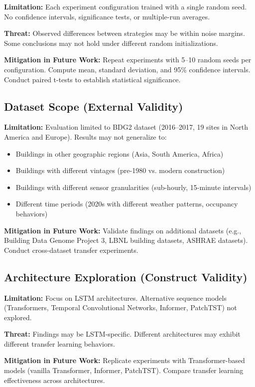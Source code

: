 \documentclass[12pt,a4paper]{report}
\begin{document}
\textbf{Limitation:} Each experiment configuration trained with a single random seed. No confidence intervals, significance tests, or multiple-run averages.

\textbf{Threat:} Observed differences between strategies may be within noise margins. Some conclusions may not hold under different random initializations.

\textbf{Mitigation in Future Work:} Repeat experiments with 5--10 random seeds per configuration. Compute mean, standard deviation, and 95\% confidence intervals. Conduct paired t-tests to establish statistical significance.

\subsection{Dataset Scope (External Validity)}

\textbf{Limitation:} Evaluation limited to BDG2 dataset (2016--2017, 19 sites in North America and Europe). Results may not generalize to:
\begin{itemize}
    \item Buildings in other geographic regions (Asia, South America, Africa)
    \item Buildings with different vintages (pre-1980 vs. modern construction)
    \item Buildings with different sensor granularities (sub-hourly, 15-minute intervals)
    \item Different time periods (2020s with different weather patterns, occupancy behaviors)
\end{itemize}

\textbf{Mitigation in Future Work:} Validate findings on additional datasets (e.g., Building Data Genome Project 3, LBNL building datasets, ASHRAE datasets). Conduct cross-dataset transfer experiments.

\subsection{Architecture Exploration (Construct Validity)}

\textbf{Limitation:} Focus on LSTM architectures. Alternative sequence models (Transformers, Temporal Convolutional Networks, Informer, PatchTST) not explored.

\textbf{Threat:} Findings may be LSTM-specific. Different architectures may exhibit different transfer learning behaviors.

\textbf{Mitigation in Future Work:} Replicate experiments with Transformer-based models (vanilla Transformer, Informer, PatchTST). Compare transfer learning effectiveness across architectures.
\end{document}
